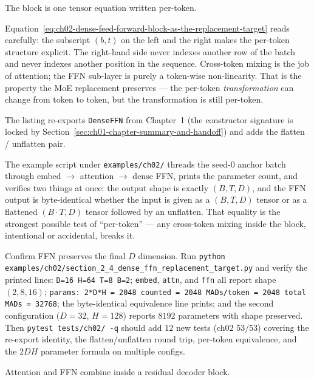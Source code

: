 

The block is one tensor equation written per-token.



Equation~\ref{eq:ch02-dense-feed-forward-block-as-the-replacement-target} reads carefully: the subscript $(b, t)$ on the left and the right makes the per-token structure explicit. The right-hand side never indexes another row of the batch and never indexes another position in the sequence. Cross-token mixing is the job of attention; the FFN sub-layer is purely a token-wise non-linearity. That is the property the MoE replacement preserves --- the per-token \emph{transformation} can change from token to token, but the transformation is still per-token.

The listing re-exports \texttt{DenseFFN} from Chapter~1 (the constructor signature is locked by Section~\ref{sec:ch01-chapter-summary-and-handoff}) and adds the flatten / unflatten pair.



The example script under \texttt{examples/ch02/} threads the seed-$0$ anchor batch through embed $\to$ attention $\to$ dense FFN, prints the parameter count, and verifies two things at once: the output shape is exactly $(B, T, D)$, and the FFN output is byte-identical whether the input is given as a $(B, T, D)$ tensor or as a flattened $(B \cdot T, D)$ tensor followed by an unflatten. That equality is the strongest possible test of ``per-token'' --- any cross-token mixing inside the block, intentional or accidental, breaks it.

\begin{checkpointbox}
Confirm FFN preserves the final $D$ dimension. Run \texttt{python examples/ch02/section\_2\_4\_dense\_ffn\_replacement\_target.py} and verify the printed lines: \texttt{D=16  H=64  T=8  B=2}; \texttt{embed}, \texttt{attn}, and \texttt{ffn} all report shape $(2, 8, 16)$; \texttt{params: 2*D*H = 2048    counted = 2048    MADs/token = 2048    total MADs = 32768}; the byte-identical equivalence line prints; and the second configuration ($D=32$, $H=128$) reports $8192$ parameters with shape preserved. Then \texttt{pytest tests/ch02/ -q} should add $12$ new tests (ch02 $53/53$) covering the re-export identity, the flatten/unflatten round trip, per-token equivalence, and the $2 D H$ parameter formula on multiple configs.
\end{checkpointbox}

Attention and FFN combine inside a residual decoder block.
